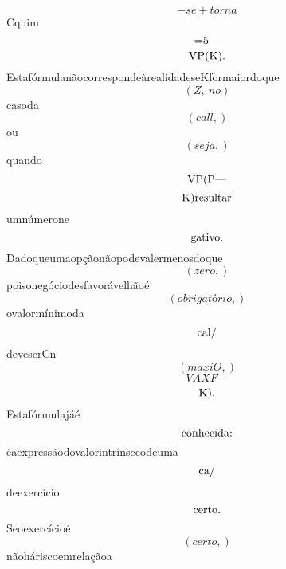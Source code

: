 \documentclass{article}
\begin{document}
\begin{equation}
- se + torna
\end{equation}Cquim\begin{equation}
$=5—$
\end{equation}\begin{equation}
$VP(K).$
\end{equation}EstafórmulanãocorrespondeàrealidadeseKformaiordoque\begin{equation}
\left( Z, \  no\right)
\end{equation}casoda\begin{equation}
\left( call,\right)
\end{equation}ou\begin{equation}
\left( seja,\right)
\end{equation}quando\begin{equation}
$VP(P—$
\end{equation}\begin{equation}
$K)resultar$
\end{equation}umnúmerone\begin{equation}
$gativo.$
\end{equation}Dadoqueumaopçãonãopodevalermenosdoque\begin{equation}
\left( zero,\right)
\end{equation}poisonegóciodesfavorávelhãoé\begin{equation}
\left( obrigatório,\right)
\end{equation}ovalormínimoda\begin{equation}
$cal/$
\end{equation}deveserCn\begin{equation}
\left( maxiO,\right)
\end{equation}\begin{equation}
VAXF—
\end{equation}\begin{equation}
$K).$
\end{equation}Estafórmulajáé\begin{equation}
$conhecida:$
\end{equation}éaexpressãodovalorintrínsecodeuma\begin{equation}
$ca/$
\end{equation}deexercício\begin{equation}
$certo.$
\end{equation}Seoexercícioé\begin{equation}
\left( certo,\right)
\end{equation}nãoháriscoemrelaçãoa\begin{equation}

\end{equation}
\end{document}
